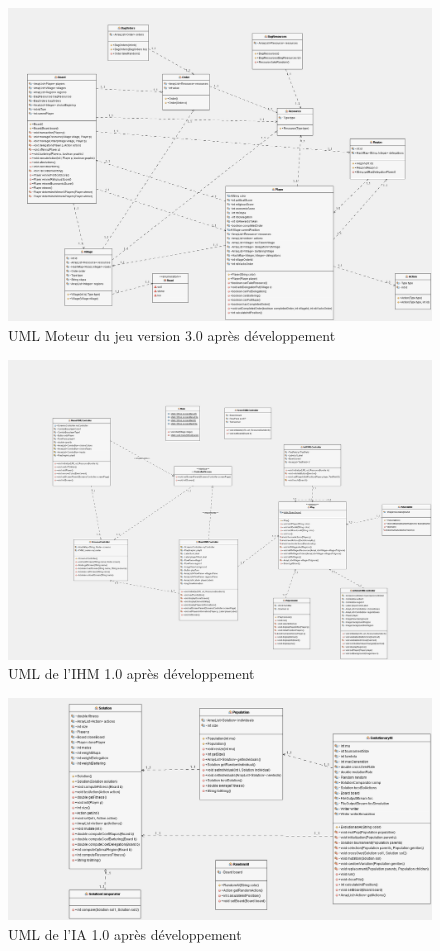 \begin{figure}[ht]
	\centering
	\includegraphics[width=1\linewidth]{images/UML_Himalaya_CORE_3}
	\caption{UML Moteur du jeu version 3.0 après développement}
	\label{fig:UMLCore2}
\end{figure}
\begin{figure}[ht]
	\centering
	\includegraphics[width=1\linewidth]{images/UML_Himalaya_IHM_1}
	\caption{UML de l'IHM 1.0 après développement}
	\label{fig:UML_IHM}
\end{figure}
\begin{figure}[ht]
	\centering
	\includegraphics[width=1\linewidth]{images/UML_Himalaya_IA_1}
	\caption{UML de l'IA 1.0 après développement}
	\label{fig:UML_IA}
\end{figure}
